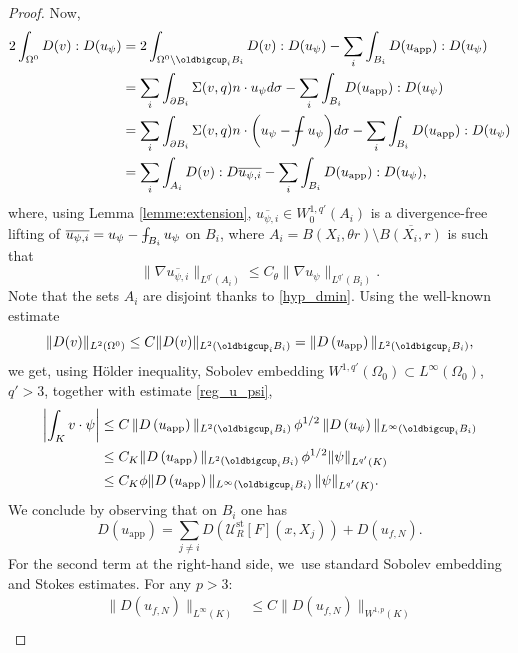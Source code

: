 \documentclass[JEP,XML,SOM,Unicode,NoEqCountersInSection,published]{cedram}
\newcommand{\app}{\mathrm{app}}
\newcommand{\st}{\mathrm{st}}
\def\Xint#1{\mathchoice
{\XXint\displaystyle\textstyle{#1}}%
{\XXint\textstyle\scriptstyle{#1}}%
{\XXint\scriptstyle\scriptscriptstyle{#1}}%
{\XXint\scriptscriptstyle\scriptscriptstyle{#1}}%
\!\int}
\def\XXint#1#2#3{{\setbox0=\hbox{$#1{#2#3}{\int}$ }
\vcenter{\hbox{$#2#3$ }}\kern-.6\wd0}}
\def\dashint{\Xint-}
\theoremstyle{plain}
\theoremstyle{definition}
\let\na\nabla
\begin{document}
\begin{proof}
Now,
\begin{align*}
2\int_{\Omega^0} D(v): D (u_\psi) &= 2\int_{\Omega^0\setminus \oldbigcup_i {B}_i} D(v): D (u_\psi) - \sum_i \int_{B_i} D(u_{\app}): D(u_\psi)\\
&=\sum_i \int_{\partial B_i} \Sigma(v,q)n \cdot u_\psi d \sigma - \sum_i \int_{B_i} D(u_{\app}): D(u_\psi)\\
&=\sum_i \int_{\partial B_i} \Sigma(v,q)n \cdot \biggl(u_\psi - \dashint u_\psi \biggr)d \sigma - \sum_i \int_{B_i} D(u_{\app}): D(u_\psi)\\
&= \sum_i \int_{A_i} D(v):D \overline{u_{\psi,i}} - \sum_i \int_{B_i} D(u_{\app}): D(u_\psi),
\end{align*}
where, using Lemma \ref{lemme:extension}, $\overline{u_{\psi,i}} \in W^{1,q'}_0(A_i)$ is a divergence-free lifting of $ \overline{u_{\psi,i}}=u_\psi -\nobreak \dashint_{B_i} u_\psi$ on $B_i$, where $A_i =B(X_i,\theta r)\setminus \overline{B(X_i,r)}$ is such that
\begin{equation}\label{eq:bound_u_psi_i}
\|\na \overline{u_{\psi,i}}\|_{L^{q'}(A_i)}\leq C_\theta \|\nabla u_\psi \|_{L^{q'}(B_i)}.
\end{equation}
Note that the sets $A_i$ are disjoint thanks to \eqref{hyp_dmin}. Using the well-known estimate \cite[Prop.\,2.1]{Gerard-VaretMecherbet20}
\[
\|D(v)\|_{L^2(\Omega^0)} \le C\|D(v)\|_{L^2(\oldbigcup_i B_i)} = \|D\left(u_{\app}\right)\|_{L^2(\oldbigcup_i B_i)},
\]
we get, using Hölder inequality, Sobolev embedding $W^{1,q'}(\Omega_0) \subset L^\infty(\Omega_0) $, $q'>3$, together with estimate \eqref{reg_u_psi},
\begin{align*}
\left |\int_K v \cdot \psi \right|& \leq C\,\|D \left(u_{\app}\right)\|_{L^2(\oldbigcup_i B_i)}\,\phi^{1/2}\, \|D \left(u_{\psi}\right)\|_{L^\infty(\oldbigcup_i B_i)}\\
&\leq C_K \| D\left(u_{\app}\right) \|_{L^2(\oldbigcup_i B_i)}\, \phi^{1/2} \|\psi\|_{L^{q'}(K)}\\
&\leq C_K \phi\| D\left(u_{\app} \right)\|_{L^\infty(\oldbigcup_i B_i)}\, \|\psi\|_{L^{q'}(K)}.
\end{align*}
We conclude by observing that on $B_i$ one has
\[
D\left(u_{\app}\right)= \sum_{j \neq i} D\left(\mathcal{U}^{\st}_R[F] (x,X_j)\right)+ D(u_{f,N}).
\]
For the second term at the right-hand side, we~use standard Sobolev embedding and Stokes estimates. For any $p > 3$:
\begin{align*}
\|D\left(u_{f,N}\right)\|_{L^\infty(K)} &\le C \|D\left(u_{f,N}\right)\|_{W^{1,p}(K)}\\

\end{align*}
\end{proof}
\end{document}
